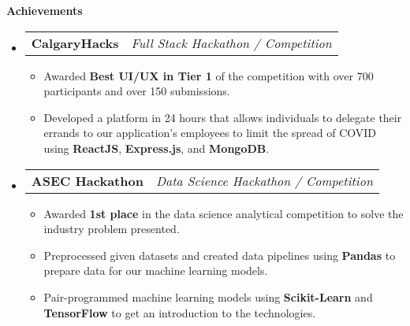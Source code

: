 \documentclass[letterpaper,12pt]{article}[leftmargin=*]
\makeatletter
\def \entryspacing {-0pt}
\renewcommand{\section}[2]{\vspace{5pt}
  \colorbox{secondary}{\color{white}\raggedbottom\normalsize\textbf{{#1}{\hspace{7pt}#2}}}
}
\newcommand{\resumeEntryStart}{\begin{itemize}[leftmargin=2.5mm]}
\newcommand{\resumeEntryEnd}{\end{itemize}\vspace{\entryspacing}}
\newcommand{\resumeItemListStart}{\begin{itemize}[leftmargin=4.5mm]}
\newcommand{\resumeItemListEnd}{\end{itemize}}
\newcommand{\resumeItem}[1]{
  \item\footnotesize{
    {#1 \vspace{-2pt}}
  }
}
\newcommand{\resumeEntryTD}[2]{
  \vspace{-1pt}\item[]
    \begin{tabularx}{0.97\textwidth}{X@{\hspace{60pt}}r}
      \textbf{\color{primary}#1} & {\firabook\color{accent}\small#2} \\
    \end{tabularx}\vspace{-6pt}
}
\makeatother
\begin{document}
 
 \section{\faFlag}{Achievements}
 
 \resumeEntryStart
    \resumeEntryTD
      {CalgaryHacks}{\it Full Stack Hackathon / Competition}
    \resumeItemListStart
      \resumeItem {Awarded {\bf Best UI/UX in Tier 1} of the competition with over 700 participants and over 150 submissions.}
      \resumeItem {Developed a platform in 24 hours that allows individuals to delegate their errands to our application’s employees to limit the spread of COVID using {\bf ReactJS}, {\bf Express.js}, and {\bf MongoDB}.}
    \resumeItemListEnd
  \resumeEntryEnd
  
  \resumeEntryStart
    \resumeEntryTD
      {ASEC Hackathon}{\it Data Science Hackathon / Competition}
    \resumeItemListStart
      \resumeItem {Awarded {\bf 1st place} in the data science analytical competition to solve the industry problem presented.}
      \resumeItem {Preprocessed given datasets and created data pipelines using {\bf Pandas} to prepare data for our machine learning models.}
      \resumeItem {Pair-programmed machine learning models using {\bf Scikit-Learn} and {\bf TensorFlow} to get an introduction to the technologies.}
    \resumeItemListEnd
  \resumeEntryEnd
\end{document}
